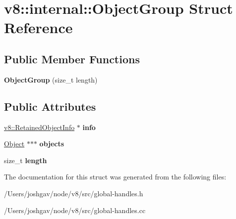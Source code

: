 \hypertarget{structv8_1_1internal_1_1_object_group}{}\section{v8\+:\+:internal\+:\+:Object\+Group Struct Reference}
\label{structv8_1_1internal_1_1_object_group}
\subsection*{Public Member Functions}
\begin{DoxyCompactItemize}
\item 
{\bfseries Object\+Group} (size\+\_\+t length)\hypertarget{structv8_1_1internal_1_1_object_group_a4bb040142bb977b125b3022aed3a21ba}{}\label{structv8_1_1internal_1_1_object_group_a4bb040142bb977b125b3022aed3a21ba}

\end{DoxyCompactItemize}
\subsection*{Public Attributes}
\begin{DoxyCompactItemize}
\item 
\hyperlink{classv8_1_1_retained_object_info}{v8\+::\+Retained\+Object\+Info} $\ast$ {\bfseries info}\hypertarget{structv8_1_1internal_1_1_object_group_a6bb7e53963ec8ea1bbd1b0e08521076c}{}\label{structv8_1_1internal_1_1_object_group_a6bb7e53963ec8ea1bbd1b0e08521076c}

\item 
\hyperlink{classv8_1_1internal_1_1_object}{Object} $\ast$$\ast$$\ast$ {\bfseries objects}\hypertarget{structv8_1_1internal_1_1_object_group_ad6b1302b2c725967f6ad435497d1bb35}{}\label{structv8_1_1internal_1_1_object_group_ad6b1302b2c725967f6ad435497d1bb35}

\item 
size\+\_\+t {\bfseries length}\hypertarget{structv8_1_1internal_1_1_object_group_a39f75e31d8f5d86bd48536bfb197f1cc}{}\label{structv8_1_1internal_1_1_object_group_a39f75e31d8f5d86bd48536bfb197f1cc}

\end{DoxyCompactItemize}


The documentation for this struct was generated from the following files\+:\begin{DoxyCompactItemize}
\item 
/\+Users/joshgav/node/v8/src/global-\/handles.\+h\item 
/\+Users/joshgav/node/v8/src/global-\/handles.\+cc\end{DoxyCompactItemize}
